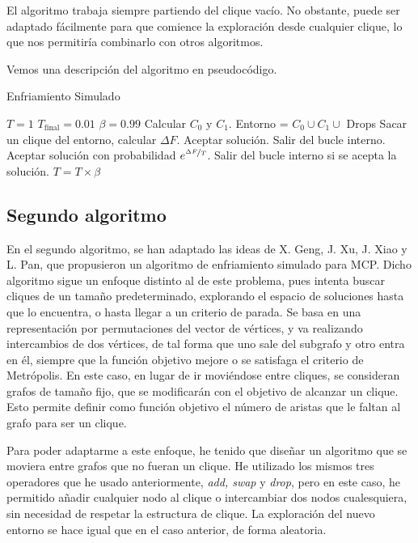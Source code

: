 El algoritmo trabaja siempre partiendo del clique vacío. No obstante, puede ser adaptado fácilmente para que
comience la exploración desde cualquier clique, lo que nos permitiría combinarlo con otros algoritmos.

Vemos una descripción del algoritmo en pseudocódigo.

\begin{algorithm}[H]
\caption{Enfriamiento Simulado}
  \begin{algorithmic}
    \State $T = 1$
    \State $T_{\text{final}} = 0.01$
    \State $\beta = 0.99$
    \State Calcular $C_0$ y $C_1$.
    \Repeat
      \State Entorno = $C_0 \cup C_1 \cup$ Drops
      \Repeat
        \State Sacar un clique del entorno, calcular $\Delta F$.
          \State Aceptar solución.
          \State Salir del bucle interno.
        \Else
          \State Aceptar solución con probabilidad $e^{\nicefrac{\Delta F}{T}}$.
          \State Salir del bucle interno si se acepta la solución.
        \EndIf
      \State $T = T \times \beta$
  \end{algorithmic}
\end{algorithm}

\subsection{Segundo algoritmo}

En el segundo algoritmo, se han adaptado las ideas de X. Geng, J. Xu, J. Xiao y L. Pan, que propusieron un
algoritmo de enfriamiento simulado para MCP. Dicho algoritmo sigue un enfoque distinto al de este problema,
pues intenta buscar cliques de un tamaño predeterminado, explorando el espacio de soluciones hasta
que lo encuentra, o hasta llegar a un criterio de parada. Se basa en una representación por permutaciones
del vector de vértices, y va realizando intercambios de dos vértices, de tal forma que uno sale del
subgrafo y otro entra en él, siempre que la función objetivo mejore o se satisfaga el criterio de Metrópolis.
En este caso, en lugar de ir moviéndose entre cliques, se consideran grafos de tamaño fijo, que se modificarán
con el objetivo de alcanzar un clique. Esto permite definir como función objetivo el número de aristas que le
faltan al grafo para ser un clique.

Para poder adaptarme a este enfoque, he tenido que diseñar un algoritmo que se moviera entre grafos que no
fueran un clique. He utilizado los mismos tres operadores que he usado anteriormente,
\textit{add, swap} y \textit{drop}, pero en este caso, he permitido añadir cualquier nodo al clique
o intercambiar dos nodos cualesquiera, sin necesidad de respetar la estructura de clique.
La exploración del nuevo entorno se hace igual que en el caso anterior, de forma aleatoria.

